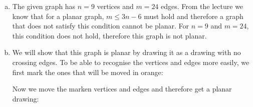 \documentclass[a4paper,12pt,headsepline]{scrartcl}
\begin{document}
\begin{enumerate}[a)]
  \item The given graph has $n=9$ vertices and $m=24$ edges.
    From the lecture we know that for a planar graph, $m\le3n-6$ must hold and therefore a graph that does not satisfy this condition cannot be planar.
    For $n=9$ and $m=24$, this condition does not hold, therefore this graph is not planar.
  \item We will show that this graph is planar by drawing it as a drawing with no crossing edges.
    To be able to recognise the vertices and edges more easily, we first mark the ones that will be moved in orange:
    \begin{center}
    \end{center}
    Now we move the marken vertices and edges and therefore get a planar drawing:
    \begin{center}
\end{center}
\end{enumerate}
\end{document}
